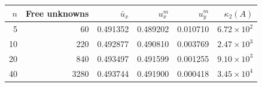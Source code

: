 \begin{tabular}{rrrrrr}
\toprule
$n$ & Free unknowns & $\bar u_x$ & $u_x^m$ & $u_y^m$ & $\kappa_2(A)$\\
\midrule
5 & 60 & 0.491352 & 0.489202 & 0.010710 & $6.72\times10^{2}$ \\
10 & 220 & 0.492877 & 0.490810 & 0.003769 & $2.47\times10^{3}$ \\
20 & 840 & 0.493497 & 0.491599 & 0.001255 & $9.10\times10^{3}$ \\
40 & 3280 & 0.493744 & 0.491900 & 0.000418 & $3.45\times10^{4}$ \\
\bottomrule
\end{tabular}
